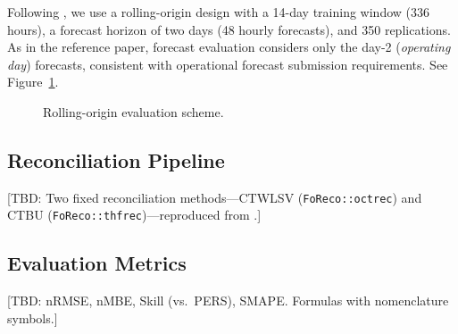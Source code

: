Following \citet{difonzo2023spatiotemporal}, we use a rolling-origin design with a 14-day training window (336 hours), a forecast horizon of two days (48 hourly forecasts), and 350 replications. As in the reference paper, forecast evaluation considers only the day-2 (\emph{operating day}) forecasts, consistent with operational forecast submission requirements. See Figure~\ref{fig:rolling-origin}.

\begin{figure}[htbp]
    \centering
    \caption{Rolling-origin evaluation scheme.}
    \label{fig:rolling-origin}
\end{figure}

\subsection{Reconciliation Pipeline}\label{sec:reco-pipeline}

[TBD: Two fixed reconciliation methods---CTWLSV (\texttt{FoReco::octrec}) and CTBU (\texttt{FoReco::thfrec})---reproduced from \citet{difonzo2023spatiotemporal}.]

\subsection{Evaluation Metrics}\label{sec:metrics}

[TBD: nRMSE, nMBE, Skill (vs.\ PERS), SMAPE. Formulas with nomenclature symbols.]
